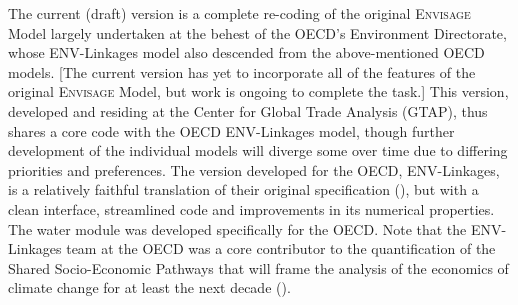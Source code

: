 \documentclass[11pt,letterpaper]{report}
\begin{document}
The current (draft) version is a complete re-coding of the original
\textsc{Envisage} Model largely undertaken at the behest of the OECD's
Environment Directorate, whose ENV-Linkages model also descended from the
above-mentioned OECD models. [The current version has yet to incorporate all of
the features of the original \textsc{Envisage} Model, but work is ongoing to
complete the task.] This version, developed and residing at the Center for
Global Trade Analysis (GTAP), thus shares a core code with the OECD ENV-Linkages
model, though further development of the individual models will diverge some
over time due to differing priorities and preferences. The version developed for
the OECD, ENV-Linkages, is a relatively faithful translation of their original
specification (\cite{ChateauetalOECD2014}), but with a clean interface,
streamlined code and improvements in its numerical properties. The water module
was developed specifically for the OECD. Note that the ENV-Linkages team at the
OECD was a core contributor to the quantification of the Shared Socio-Economic
Pathways that will frame the analysis of the economics of climate change for at
least the next decade (\cite{DellinketalGEC2017}).
\end{document}
